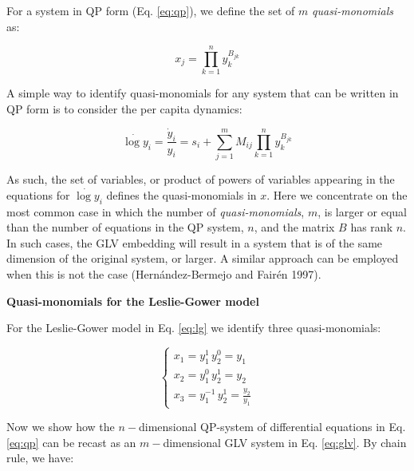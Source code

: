 \documentclass{article}
\begin{document}
\label{sec:qptoglv}

For a system in QP form (Eq. \ref{eq:qp}), we define the set of \(m\)
\emph{quasi-monomials} as:

\begin{equation}
\label{eq:quasimono}
x_j = \prod_{k=1}^n y_k^{B_{jk}}
\end{equation}

A simple way to identify quasi-monomials for any system that can be
written in QP form is to consider the per capita dynamics:

\begin{equation}
\dot{\log y}_i = \frac{\dot{y}_i}{y_i} = s_i + \sum_{j = 1}^m M_{ij} \prod_{k = 1}^n y_k^{B_{jk}}
\end{equation}

As such, the set of variables, or product of powers of variables
appearing in the equations for \(\dot{\log y}_i\) defines the
quasi-monomials in \(x\). Here we concentrate on the most common case in
which the number of \emph{quasi-monomials}, \(m\), is larger or equal
than the number of equations in the QP system, \(n\), and the matrix
\(B\) has rank \(n\). In such cases, the GLV embedding will result in a
system that is of the same dimension of the original system, or larger.
A similar approach can be employed when this is not the case
(Hernández-Bermejo and Fairén 1997).

\begin{cb}
\textbf{Quasi-monomials for the Leslie-Gower model}

For the Leslie-Gower model in Eq. \ref{eq:lg} we identify three quasi-monomials:

\begin{equation}
\label{eq:lgqm}
\begin{cases}
x_1 = y_1^1 \, y_2^0 = y_1\\
x_2 = y_1^0 \, y_2^1 = y_2\\
x_3 = y_1^{-1} \, y_2^1 = \frac{y_2}{y_1}
\end{cases}
\end{equation}

\end{cb}

Now we show how the \(n-\)dimensional QP-system of differential
equations in Eq. \ref{eq:qp} can be recast as an \(m-\)dimensional GLV
system in Eq. \ref{eq:glv}. By chain rule, we have:
\end{document}
